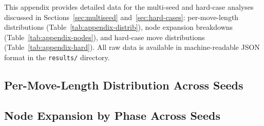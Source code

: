 \documentclass[conference]{IEEEtran}
\begin{document}
This appendix provides detailed data for the multi-seed and hard-case analyses discussed in Sections~\ref{sec:multiseed} and~\ref{sec:hard-cases}: per-move-length distributions (Table~\ref{tab:appendix-distrib}), node expansion breakdowns (Table~\ref{tab:appendix-nodes}), and hard-case move distributions (Table~\ref{tab:appendix-hard}). All raw data is available in machine-readable JSON format in the \texttt{results/} directory.

\subsection{Per-Move-Length Distribution Across Seeds}

\begin{table}[htbp]
\centering
\caption{Per-move-length distribution across all seeds (200 scrambles each). $K{=}5$ consistently shifts mass from $21{+}$ to $\leq$20 moves.}
\label{tab:appendix-distrib}
\end{table}

\subsection{Node Expansion by Phase Across Seeds}
\end{document}
